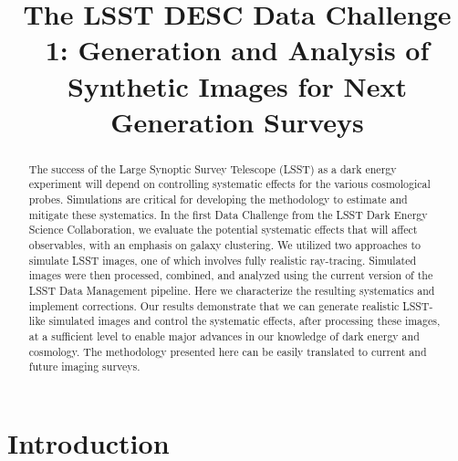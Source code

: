 \documentclass[\docopts]{\docclass}
\begin{document}
\title[LSST DESC DC1]{The LSST DESC Data Challenge 1: Generation and Analysis of Synthetic Images for Next Generation Surveys }

\maketitlepre

\begin{abstract}

The success of the Large Synoptic Survey Telescope (LSST) as a dark energy experiment will depend on controlling systematic effects for the various cosmological probes.  Simulations are critical for developing the methodology to estimate and mitigate these systematics.  In the first Data Challenge from the LSST Dark Energy Science Collaboration, we evaluate the potential systematic effects that will affect observables, with an emphasis on galaxy clustering.  We utilized two approaches to simulate LSST images, one of which involves fully realistic ray-tracing.  Simulated images were then processed, combined, and analyzed using the current version of the LSST Data Management pipeline.  Here we characterize the resulting systematics and implement corrections.  Our results demonstrate that we can generate realistic LSST-like simulated images and control the systematic effects, after processing these images, at a sufficient level to enable major advances in our knowledge of dark energy and cosmology. The methodology presented here can be easily translated to current and future imaging surveys.
\end{abstract}


\maketitlepost

%

\section{Introduction}
\label{sec:intro}
\end{document}
